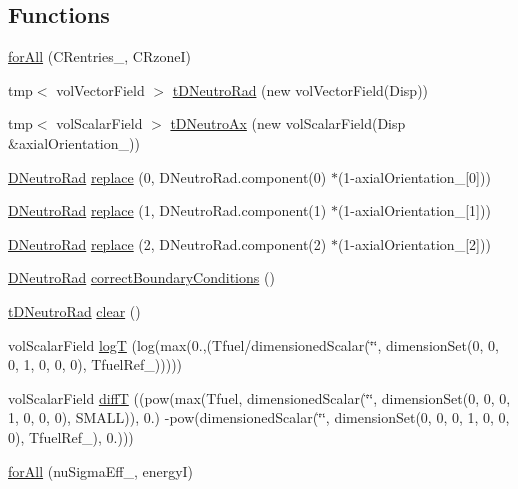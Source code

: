 \subsection*{Functions}
\begin{DoxyCompactItemize}
\item 
\hyperlink{setNeutronicsVariables_8H_a2428955ee674d42574e73d905589463a}{for\+All} (C\+Rentries\+\_\+, C\+RzoneI)
\item 
tmp$<$ vol\+Vector\+Field $>$ \hyperlink{setNeutronicsVariables_8H_afa1924c2930d19332a837e537c64845e}{t\+D\+Neutro\+Rad} (new vol\+Vector\+Field(Disp))
\item 
tmp$<$ vol\+Scalar\+Field $>$ \hyperlink{setNeutronicsVariables_8H_a4b681fea0e57309f57a1b08f367dcd60}{t\+D\+Neutro\+Ax} (new vol\+Scalar\+Field(Disp \&axial\+Orientation\+\_\+))
\item 
\hyperlink{setNeutronicsVariablesLowMem_8H_a87a8e73540cc64ca6321cea333ded9ac}{D\+Neutro\+Rad} \hyperlink{setNeutronicsVariables_8H_ac63c673bca144ef7bb27f93a31b21ef3}{replace} (0, D\+Neutro\+Rad.\+component(0) $\ast$(1-\/axial\+Orientation\+\_\+\mbox{[}0\mbox{]}))
\item 
\hyperlink{setNeutronicsVariablesLowMem_8H_a87a8e73540cc64ca6321cea333ded9ac}{D\+Neutro\+Rad} \hyperlink{setNeutronicsVariables_8H_a7c1faf6ceb840262125e7eadc454b715}{replace} (1, D\+Neutro\+Rad.\+component(1) $\ast$(1-\/axial\+Orientation\+\_\+\mbox{[}1\mbox{]}))
\item 
\hyperlink{setNeutronicsVariablesLowMem_8H_a87a8e73540cc64ca6321cea333ded9ac}{D\+Neutro\+Rad} \hyperlink{setNeutronicsVariables_8H_a72c5bb2aaa0a46f9f16e5d5481e39caa}{replace} (2, D\+Neutro\+Rad.\+component(2) $\ast$(1-\/axial\+Orientation\+\_\+\mbox{[}2\mbox{]}))
\item 
\hyperlink{setNeutronicsVariablesLowMem_8H_a87a8e73540cc64ca6321cea333ded9ac}{D\+Neutro\+Rad} \hyperlink{setNeutronicsVariables_8H_a376b322b6046a21fa234a3bcb766c325}{correct\+Boundary\+Conditions} ()
\item 
\hyperlink{setNeutronicsVariablesLowMem_8H_af987e7657f44458198bb766611f35673}{t\+D\+Neutro\+Rad} \hyperlink{setNeutronicsVariables_8H_af06fa450a9d25b0d1f306ef2f6d6945d}{clear} ()
\item 
vol\+Scalar\+Field \hyperlink{setNeutronicsVariables_8H_ac3266d7d875a58811ea0aa5a572cbd45}{logT} (log(max(0.,(Tfuel/dimensioned\+Scalar(\char`\"{}\char`\"{}, dimension\+Set(0, 0, 0, 1, 0, 0, 0), Tfuel\+Ref\+\_\+)))))
\item 
vol\+Scalar\+Field \hyperlink{setNeutronicsVariables_8H_a47408efd16b97fd30fdd2bf55fb4b199}{diffT} ((pow(max(Tfuel, dimensioned\+Scalar(\char`\"{}\char`\"{}, dimension\+Set(0, 0, 0, 1, 0, 0, 0), S\+M\+A\+LL)), 0.) -\/pow(dimensioned\+Scalar(\char`\"{}\char`\"{}, dimension\+Set(0, 0, 0, 1, 0, 0, 0), Tfuel\+Ref\+\_\+), 0.)))
\item 
\hyperlink{setNeutronicsVariables_8H_a18680aaf1d13afdaf2eedb40096566be}{for\+All} (nu\+Sigma\+Eff\+\_\+, energyI)
\end{DoxyCompactItemize}
